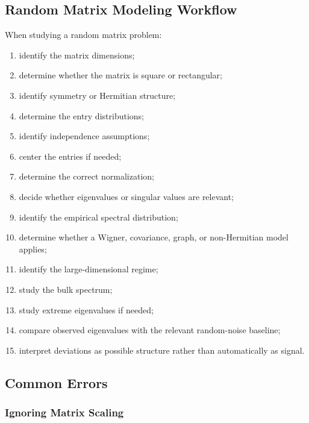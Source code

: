 \subsection{Random Matrix Modeling Workflow}
\label{subsec:rmt-modeling-workflow}

When studying a random matrix problem:

\begin{enumerate}
    \item identify the matrix dimensions;
    \item determine whether the matrix is square or rectangular;
    \item identify symmetry or Hermitian structure;
    \item determine the entry distributions;
    \item identify independence assumptions;
    \item center the entries if needed;
    \item determine the correct normalization;
    \item decide whether eigenvalues or singular values are relevant;
    \item identify the empirical spectral distribution;
    \item determine whether a Wigner, covariance, graph, or
          non-Hermitian model applies;
    \item identify the large-dimensional regime;
    \item study the bulk spectrum;
    \item study extreme eigenvalues if needed;
    \item compare observed eigenvalues with the relevant random-noise
          baseline;
    \item interpret deviations as possible structure rather than
          automatically as signal.
\end{enumerate}

\subsection{Common Errors}
\label{subsec:rmt-common-errors}

\subsubsection{Ignoring Matrix Scaling}

